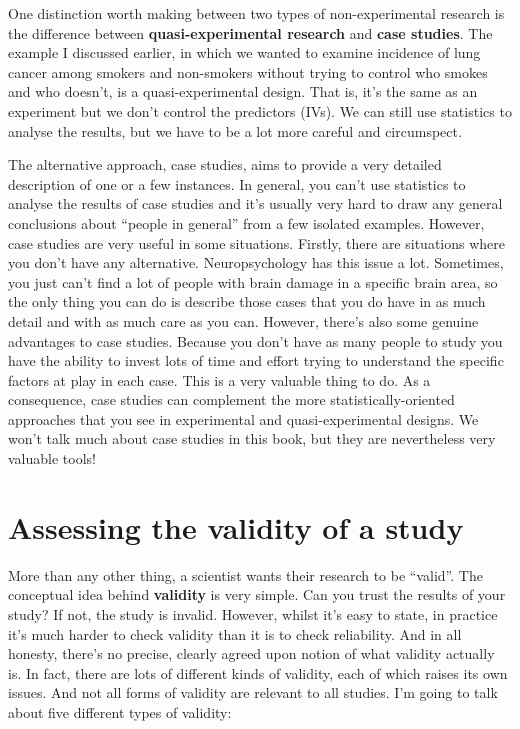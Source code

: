 \documentclass[
  a4paper,
]{book}
\begin{document}
One distinction worth making between two types of non-experimental
research is the difference between \textbf{quasi-experimental research}
and \textbf{case studies}. The example I discussed earlier, in which we
wanted to examine incidence of lung cancer among smokers and non-smokers
without trying to control who smokes and who doesn't, is a
quasi-experimental design. That is, it's the same as an experiment but
we don't control the predictors (IVs). We can still use statistics to
analyse the results, but we have to be a lot more careful and
circumspect.

The alternative approach, case studies, aims to provide a very detailed
description of one or a few instances. In general, you can't use
statistics to analyse the results of case studies and it's usually very
hard to draw any general conclusions about ``people in general'' from a
few isolated examples. However, case studies are very useful in some
situations. Firstly, there are situations where you don't have any
alternative. Neuropsychology has this issue a lot. Sometimes, you just
can't find a lot of people with brain damage in a specific brain area,
so the only thing you can do is describe those cases that you do have in
as much detail and with as much care as you can. However, there's also
some genuine advantages to case studies. Because you don't have as many
people to study you have the ability to invest lots of time and effort
trying to understand the specific factors at play in each case. This is
a very valuable thing to do. As a consequence, case studies can
complement the more statistically-oriented approaches that you see in
experimental and quasi-experimental designs. We won't talk much about
case studies in this book, but they are nevertheless very valuable
tools!

\section{Assessing the validity of a
study}\label{assessing-the-validity-of-a-study}

More than any other thing, a scientist wants their research to be
``valid''. The conceptual idea behind \textbf{validity} is very simple.
Can you trust the results of your study? If not, the study is invalid.
However, whilst it's easy to state, in practice it's much harder to
check validity than it is to check reliability. And in all honesty,
there's no precise, clearly agreed upon notion of what validity actually
is. In fact, there are lots of different kinds of validity, each of
which raises its own issues. And not all forms of validity are relevant
to all studies. I'm going to talk about five different types of
validity:
\end{document}
